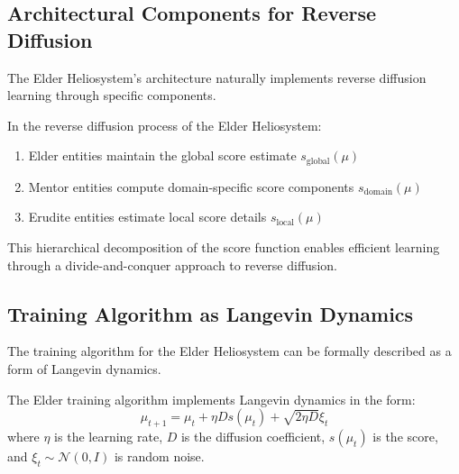 \subsection{Architectural Components for Reverse Diffusion}

The Elder Heliosystem's architecture naturally implements reverse diffusion learning through specific components.

\begin{theorem}
In the reverse diffusion process of the Elder Heliosystem:
\begin{enumerate}
    \item Elder entities maintain the global score estimate $s_{\text{global}}(\mu)$
    \item Mentor entities compute domain-specific score components $s_{\text{domain}}(\mu)$
    \item Erudite entities estimate local score details $s_{\text{local}}(\mu)$
\end{enumerate}
\end{theorem}

This hierarchical decomposition of the score function enables efficient learning through a divide-and-conquer approach to reverse diffusion.

\subsection{Training Algorithm as Langevin Dynamics}

The training algorithm for the Elder Heliosystem can be formally described as a form of Langevin dynamics.

\begin{theorem}
The Elder training algorithm implements Langevin dynamics in the form:
\begin{equation}
\mu_{t+1} = \mu_t + \eta D s(\mu_t) + \sqrt{2\eta D} \xi_t
\end{equation}
where $\eta$ is the learning rate, $D$ is the diffusion coefficient, $s(\mu_t)$ is the score, and $\xi_t \sim \mathcal{N}(0, I)$ is random noise.
\end{theorem}

